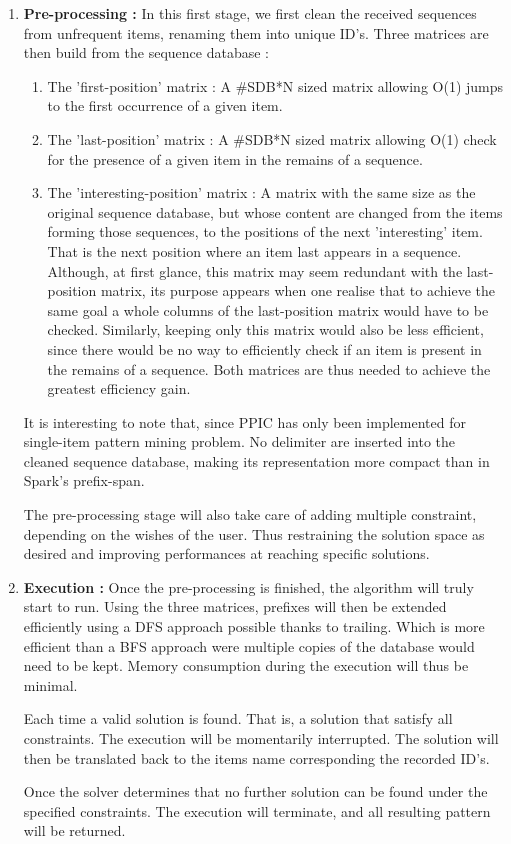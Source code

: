\documentclass{eplmastersthesis}
\begin{document}
\begin{enumerate}
\item \textbf{Pre-processing :} In this first stage, we first clean the received sequences from unfrequent items, renaming them into unique ID's. Three matrices are then build from the sequence database :
	\begin{enumerate}
		\item The 'first-position' matrix : A \#SDB*N sized matrix allowing O(1) jumps to the first occurrence of a given item. 
		\item The 'last-position' matrix : A  \#SDB*N sized matrix allowing O(1) check for the presence of a given item in the remains of a sequence.
		\item The 'interesting-position' matrix : A matrix with the same size as the original sequence database, but whose content are changed from the items forming those sequences, to the positions of the next 'interesting' item. That is the next position where an item last appears in a sequence. \\ Although, at first glance, this matrix may seem redundant with the last-position matrix, its purpose appears when one realise that to achieve the same goal a whole columns of the last-position matrix would have to be checked. Similarly, keeping only this matrix would also be less efficient, since there would be no way to efficiently check if an item is present in the remains of a sequence. Both matrices are thus needed to achieve the greatest efficiency gain. 
	\end{enumerate}
	It is interesting to note that, since PPIC has only been implemented for single-item pattern mining problem. No delimiter are inserted into the cleaned sequence database, making its representation more compact than in Spark's prefix-span. \newline
	
	The pre-processing stage will also take care of adding multiple constraint, depending on the wishes of the user. Thus restraining the solution space as desired and improving performances at reaching specific solutions.
	
\item \textbf{Execution :} Once the pre-processing is finished, the algorithm will truly start to run. Using the three matrices, prefixes will then be extended efficiently using a DFS approach possible thanks to trailing. Which is more efficient than a BFS approach were multiple copies of the database would need to be kept. Memory consumption during the execution will thus be minimal. \newline

Each time a valid solution is found. That is, a solution that satisfy all constraints. The execution will be momentarily interrupted. The solution will then be translated back to the items name corresponding the recorded ID's. \newline

Once the solver determines that no further solution can be found under the specified constraints. The execution will terminate, and all resulting pattern will be returned.
\end{enumerate}
\end{document}
